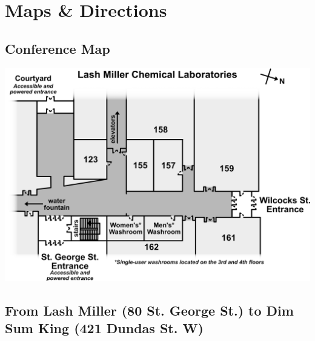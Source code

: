 \documentclass[titlepage,oneside,openany,10pt]{book}
\begin{document}
\chapter*{Maps \& Directions}
\label{chapter:maps}
{}

\section*{Conference Map}
\label{conference_map}

\begin{center}
    \includegraphics[width=\textwidth,keepaspectratio]{Other_Figures/LM_map.png}
\end{center}

\section*{From Lash Miller (80 St. George St.) to Dim Sum King (421 Dundas St. W)}
\label{conference_to_dimsumking}
\end{document}
